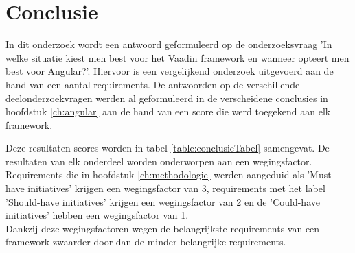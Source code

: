 
\chapter{Conclusie}
\label{ch:conclusie}

In dit onderzoek wordt een antwoord geformuleerd op de onderzoeksvraag 'In welke situatie kiest men best voor het Vaadin framework en wanneer opteert men best voor Angular?'. Hiervoor is een vergelijkend onderzoek uitgevoerd aan de hand van een aantal requirements. De antwoorden op de verschillende deelonderzoekvragen werden al geformuleerd in de verscheidene conclusies in hoofdstuk \ref{ch:angular} aan de hand van een score die werd toegekend aan elk framework.

Deze resultaten scores worden in tabel \ref{table:conclusieTabel} samengevat. De resultaten van elk onderdeel worden onderworpen aan een wegingsfactor. Requirements die in hoofdstuk \ref{ch:methodologie} werden aangeduid als 'Must-have initiatives' krijgen een wegingsfactor van 3, requirements met het label 'Should-have initiatives' krijgen een wegingsfactor van 2 en de 'Could-have initiatives' hebben een wegingsfactor van 1.\\
Dankzij deze wegingsfactoren wegen de belangrijkste requirements van een framework zwaarder door dan de minder belangrijke requirements.





